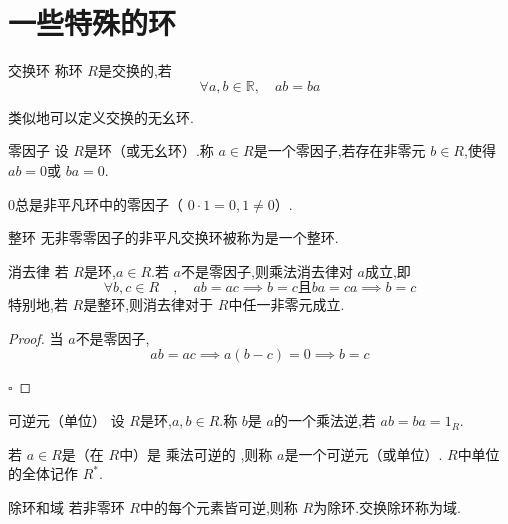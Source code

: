 \documentclass[lang=cn,12pt,color=green,fontset=none,pad]{elegantbook}
\begin{document}
\section{一些特殊的环}

\begin{definition}{交换环}
    称环 \(  R  \)是交换的,若 \[
    \forall a,b \in \mathbb{R} ,\quad  ab= ba
    \] 
\end{definition}

\begin{remark}
    类似地可以定义交换的无幺环.
\end{remark}

\begin{definition}{零因子}
    设 \(  R  \)是环（或无幺环）.称 \(  a \in R  \)是一个零因子,若存在非零元 \(  b \in R  \),使得 \(  ab= 0  \)或 \(  ba= 0  \).
\end{definition}

\begin{remark}
    \(  0  \)总是非平凡环中的零因子（ \(  0\cdot 1= 0,1\neq 0  \)）.  
\end{remark}

\begin{definition}{整环}
    无非零零因子的非平凡交换环被称为是一个整环. 
\end{definition}

\begin{proposition}{消去律}
    若 \(  R  \)是环,\(   a \in R  \).若 \(  a  \)不是零因子,则乘法消去律对 \(  a  \)成立,即 \[
    \forall b,c \in R\quad,\quad   ab= ac\implies b=  c \text{且} ba= ca \implies b= c
    \]    特别地,若 \(  R  \)是整环,则消去律对于 \(  R  \)中任一非零元成立.  
\end{proposition}

\begin{proof}
    当 \(  a  \)不是零因子, 
    \[
    ab= ac\implies a\left( b-c \right)= 0 \implies b= c 
    \]

    \hfill $\square$
\end{proof}


\begin{definition}{可逆元（单位）}
    设 \(  R  \)是环,\(  a,b \in R  \).称 \(  b  \)是 \(  a  \)的一个乘法逆,若 \(  ab= ba= 1_{R}  \).
    
    若 \(  a \in R  \)是（在 \(  R  \)中）是 乘法可逆的 ,则称 \(  a  \)是一个可逆元（或单位）. \(  R  \)中单位的全体记作 \(  R^{*}  \).   
\end{definition}

\begin{definition}{除环和域}
    若非零环 \(  R  \)中的每个元素皆可逆,则称 \(  R  \)为除环.交换除环称为域.  
\end{definition}
\end{document}
